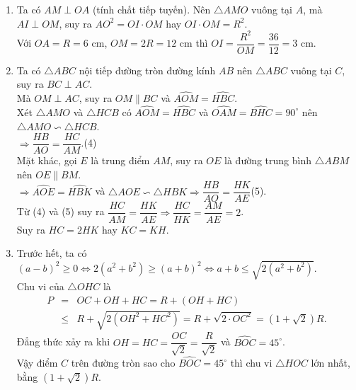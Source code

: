 \begin{bt}
{\begin{enumerate}
		Lại có $\triangle CIO$ vuông tại $I$ nên $IJ=\dfrac{1}{2}OC$.\qquad (2)\\
		Mà $\triangle OHC$ vuông tại $H$ nên $HJ=\dfrac{1}{2}OC$.\qquad (3)\\
		Từ (1), (2) và (3) suy ra $JO=JC=JI=JH$ nên bốn điểm $C$, $H$, $O$, $I$ cùng thuộc đường tròn tâm $J$, đường kính $OC$, bán kính $\dfrac{R}{2}$.
		\item Ta có $AM\perp OA$ (tính chất tiếp tuyến). Nên $\triangle AMO$ vuông tại $A$, mà $AI\perp OM$, suy ra $AO^2=OI\cdot OM$ hay $OI\cdot OM=R^2$.\\
		Với $OA=R=6$ cm, $OM=2R=12$ cm thì $OI=\dfrac{R^2}{OM}=\dfrac{36}{12}=3$ cm.
		\item Ta có $\triangle ABC$ nội tiếp đường tròn đường kính $AB$ nên $\triangle ABC$ vuông tại $C$, suy ra $BC\perp AC$.\\
		Mà $OM\perp AC$, suy ra $OM\parallel BC$ và $\widehat{AOM}=\widehat{HBC}$.\\
		Xét $\triangle AMO$ và $\triangle HCB$ có $\widehat{AOM}=\widehat{HBC}$ và $\widehat{OAM}=\widehat{BHC}=90^\circ$ nên $\triangle AMO\backsim \triangle HCB$.\\
		$\Rightarrow \dfrac{HB}{AO}=\dfrac{HC}{AM}$.\qquad (4)\\
		Mặt khác, gọi $E$ là trung điểm $AM$, suy ra $OE$ là đường trung bình $\triangle ABM$ nên $OE\parallel BM$.\\
		$\Rightarrow \widehat{AOE}=\widehat{HBK}$ và $\triangle AOE\backsim \triangle HBK\Rightarrow \dfrac{HB}{AO}=\dfrac{HK}{AE}$\qquad (5).\\
		Từ (4) và (5) suy ra $\dfrac{HC}{AM}=\dfrac{HK}{AE}\Rightarrow \dfrac{HC}{HK}=\dfrac{AM}{AE}=2$.\\
		Suy ra $HC=2HK$ hay $KC=KH$.
		\item Trước hết, ta có $(a-b)^2\ge 0\Leftrightarrow 2(a^2+b^2)\ge (a+b)^2\Leftrightarrow a+b\le \sqrt{2\left(a^2+b^2\right)}$.\\
		Chu vi của $\triangle OHC$ là
		\begin{eqnarray*}
			P & = & OC+OH+HC=R+(OH+HC)\\
			& \le & R+\sqrt{2\left(OH^2+HC^2\right)}=R+\sqrt{2\cdot OC^2}=\left(1+\sqrt{2}\right)R.
		\end{eqnarray*}
	Đẳng thức xảy ra khi $OH=HC=\dfrac{OC}{\sqrt{2}}=\dfrac{R}{\sqrt{2}}$ và $\widehat{BOC}=45^\circ$.\\
	Vậy điểm $C$ trên đường tròn sao cho $\widehat{BOC}=45^\circ$ thì chu vi $\triangle HOC$ lớn nhất, bằng $\left(1+\sqrt{2}\right)R$.
	\end{enumerate}
	}
\end{bt}

